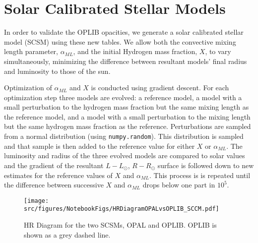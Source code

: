 \section{Solar Calibrated Stellar Models}\label{sec:SCSM}


In order to validate the OPLIB opacities, we generate a solar calibrated
stellar model (SCSM) using these new tables. We allow both the convective
mixing length parameter, $\alpha_{ML}$, and the initial Hydrogen mass fraction,
$X$, to vary simultaneously, minimizing the difference between resultant
models' final radius and luminosity to those of the sun.

Optimization of $\alpha_{ML}$ and $X$ is conducted using gradient descent. For
each optimization step three models are evolved: a reference model, a model
with a small perturbation to the hydrogen mass fraction but the same mixing
length as the reference model, and a model with a small perturbation to the
mixing length but the same hydrogen mass fraction as the reference.
Perturbations are sampled from a normal distribution (using
\texttt{numpy.random}). This distribution is sampled and that sample is then
added to the reference value for either $X$ or $\alpha_{ML}$. The luminosity
and radius of the three evolved models are compared to solar values and the
gradient of the resultant $L-L_{\odot}$, $R-R_{\odot}$ surface is followed down
to new estimates for the reference values of $X$ and $\alpha_{ML}$. This
process is is repeated until the difference between successive $X$ and
$\alpha_{ML}$ drops below one part in $10^{5}$.

\begin{figure}
	\centering
	\texttt{[image: src/figures/NotebookFigs/HRDiagramOPALvsOPLIB\_SCCM.pdf]}
	\caption{HR Diagram for the two SCSMs, OPAL and OPLIB. OPLIB is shown as a grey
	dashed line.}
	\label{fig:OPLIBOPALHR}
\end{figure}

